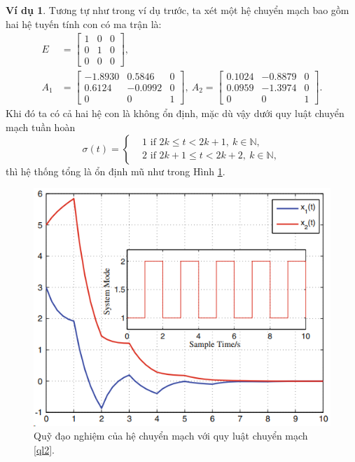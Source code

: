 \documentclass[12pt,a4paper]{report}
\theoremstyle{definition}
\newtheorem{vd}{Ví dụ}
\theoremstyle{definition}
\numberwithin{dl}{chapter}
\numberwithin{vd}{chapter}
\numberwithin{corollary}{chapter}
\numberwithin{lemma}{chapter}
\numberwithin{md}{chapter}
\numberwithin{dn}{chapter}
\numberwithin{cy}{chapter}
\numberwithin{nx}{chapter}
\begin{document}
\begin{vd}\label{}
Tương tự như trong ví dụ trước, ta xét một hệ chuyển mạch bao gồm hai hệ tuyến tính con có ma trận là:\\
$$
\begin{aligned}
E &=\left[\begin{array}{ccc}
1 & 0 & 0 \\
0 & 1 & 0 \\
0 & 0 & 0
\end{array}\right], \\
A_{1} &= {\left[\begin{array}{ccc}
-1.8930 & 0.5846 & 0 \\
0.6124 & -0.0992 & 0 \\
0 & 0 & 1
\end{array}\right] }, \   
A_{2}= {\left[\begin{array}{ccc}
0.1024 & -0.8879 & 0 \\  
0.0959 & -1.3974 & 0 \\
0 & 0 & 1
\end{array}\right] }.
\end{aligned} 
$$
Khi đó ta có cả hai hệ con là không ổn định, mặc dù vậy dưới quy luật chuyển mạch tuần hoàn
%
\begin{equation}\label{ql2}
\sigma(t) = 
\begin{cases}
&1 \mbox{ if } 2k \leq t < 2k+1, \ k \in \mathbb{N}, \\
&2 \mbox{ if } 2k+1 \leq t < 2k+2, \ k \in \mathbb{N}, 
\end{cases}
\end{equation}
%
thì hệ thống tổng là ổn định mũ như trong Hình \ref{fig:screenshot004}.

\begin{figure}[h!]
	\centering
	\includegraphics[width=0.7\linewidth]{screenshot004}
	\caption{Quỹ đạo nghiệm của hệ chuyển mạch với quy luật chuyển mạch \eqref{ql2}. }
	\label{fig:screenshot004}
\end{figure}
\end{vd}
\end{document}
